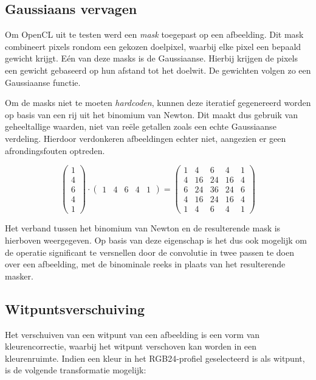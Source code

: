 \documentclass[twocolumn, a4paper]{article}
\begin{document}
\subsection{Gaussiaans vervagen}
Om OpenCL uit te testen werd een \textit{mask} toegepast op een afbeelding. Dit mask combineert pixels rondom een gekozen doelpixel, waarbij elke pixel een bepaald gewicht krijgt. E\'en van deze masks is de Gaussiaanse. Hierbij krijgen de pixels een gewicht gebaseerd op hun afstand tot het doelwit. De gewichten volgen zo een Gaussiaanse functie.

Om de masks niet te moeten \emph{hardcoden}, kunnen deze iteratief gegenereerd worden op basis van een rij uit het binomium van Newton. Dit maakt dus gebruik van geheeltallige waarden, niet van reële getallen zoals een echte Gaussiaanse verdeling. Hierdoor verdonkeren afbeeldingen echter niet, aangezien er geen afrondingsfouten optreden. 

\begin{equation*}
    \begin{pmatrix}
        1 \\
        4 \\
        6 \\
        4 \\
        1
    \end{pmatrix}
    \cdot
    \begin{pmatrix}
        1 & 4 & 6 & 4 & 1
    \end{pmatrix}
    =
    \begin{pmatrix}
        1 & 4 & 6 & 4 & 1 \\
        4 & 16 & 24 & 16 & 4 \\
        6 & 24 & 36 & 24 & 6 \\
        4 & 16 & 24 & 16 & 4 \\
        1 & 4 & 6 & 4 & 1
    \end{pmatrix}
\end{equation*}

Het verband tussen het binomium van Newton en de resulterende mask is hierboven weergegeven. Op basis van deze eigenschap is het dus ook mogelijk om de operatie significant te versnellen door de convolutie in twee passen te doen over een afbeelding, met de binominale reeks in plaats van het resulterende masker. 

\subsection{Witpuntsverschuiving}
Het verschuiven van een witpunt van een afbeelding is een vorm van kleurencorrectie, waarbij het witpunt verschoven kan worden in een kleurenruimte. Indien een kleur in het RGB24-profiel geselecteerd is als witpunt, is de volgende transformatie mogelijk:
\end{document}
